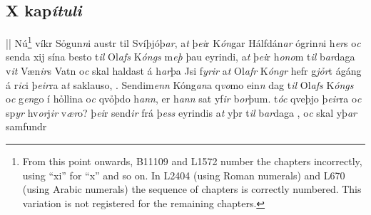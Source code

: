 \beginnumbering \pstart  
\vspace{5mm}\subsection*{X kap\textit{ítuli}}
||
Nú\footnote{From this point onwards, B11109 and L1572 number the chapters incorrectly, using \enquote{xi} for \enquote{x} and so on. In L2404 (using Roman numerals) and L670 (using Arabic numerals) the sequence of chapters is correctly numbered. This variation is not registered for the remaining chapters.} víkr Sỏgun\textit{n}i austr til Svíþjóþ\textit{ar}, 
a\textit{t} þ\textit{ei}r K\textit{ón}gar  Hálfdán\textit{ar}  ógrin\textit{n}i h\textit{er}s 
o\textit{c} senda xij sína 
besto   t\textit{il} Ol\textit{afs} K\textit{óngs} m\textit{eþ} þau eyrindi,
a\textit{t} þ\textit{ei}r   h\textit{ono}m  t\textit{il} b\textit{ar}daga   v\textit{it} Væn\textit{ir}s Vatn o\textit{c} skal   haldast á h\textit{ar}þa Jsi f\textit{yrir}  a\textit{t} Ol\textit{afr} K\textit{óngr} hefr   g\textit{jỏr}t ágáng á r\textit{ic}i þ\textit{eir}ra   a\textit{t} saklauso, 
 . 
Sendim\textit{enn} Kóng\textit{an}a q\textit{vo}mo ein\textit{n} dag t\textit{il} Ol\textit{afs} K\textit{óngs} o\textit{c} g\textit{en}go í hỏllina 
o\textit{c} qvỏþdo h\textit{ann},   er h\textit{ann} sat yf\textit{ir} b\textit{or}þum.  
 t\textit{óc} qveþjo þ\textit{eir}ra o\textit{c} sp\textit{yr} hv\textit{or}j\textit{ir} v\textit{ær}o? 
 þ\textit{ei}r   send\textit{ir} 
 frá   þ\textit{ess} eyrindis 
 a\textit{t}  
  yþr t\textit{il} b\textit{ar}daga  , 
  o\textit{c} skal yþ\textit{ar}  samfundr 
